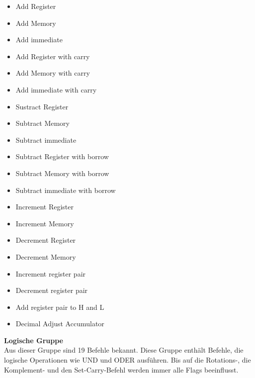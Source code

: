 \documentclass[12pt]{article}
\begin{document}
\begin{multicols}{2}
\begin{itemize}
\item Add Register
\item Add Memory
\item Add immediate
\item Add Register with carry
\item Add Memory with carry
\item Add immediate with carry
\item Sustract Register
\item Subtract Memory
\item Subtract immediate
\item Subtract Register with borrow
\item Subtract Memory with borrow
\item Subtract immediate with borrow
\item Increment Register
\item Increment Memory
\item Decrement Register
\item Decrement Memory
\item Increment register pair
\item Decrement register pair
\item Add register pair to H and L
\item Decimal Adjust Accumulator
\end{itemize}
\end{multicols}

\vspace{10pt}
\noindent
\textbf{Logische Gruppe}\\
Aus dieser Gruppe sind 19 Befehle bekannt. Diese Gruppe enthält Befehle, die logische Operationen wie UND und ODER ausführen. Bis auf die Rotations-, die Komplement- und den Set-Carry-Befehl werden immer alle Flags beeinflusst.
\end{document}
